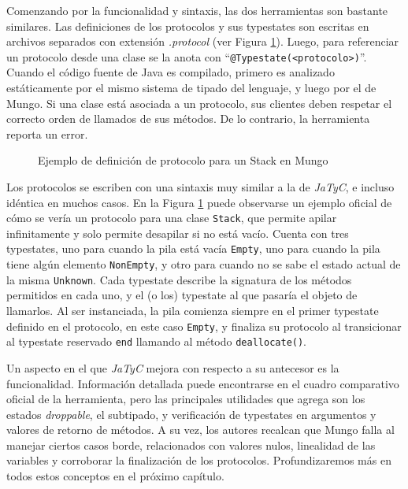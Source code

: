 Comenzando por la funcionalidad y sintaxis, las dos herramientas son bastante similares. Las definiciones de los protocolos y sus typestates son escritas en archivos separados con extensión \textit{.protocol} (ver Figura \ref{teorico:mungo}). Luego, para referenciar un protocolo desde una clase se la anota con ``\texttt{@Typestate(<protocolo>)}''. Cuando el código fuente de Java es compilado, primero es analizado estáticamente por el mismo sistema de tipado del lenguaje, y luego por el de Mungo. Si una clase está asociada a un protocolo, sus clientes deben respetar el correcto orden de llamados de sus métodos. De lo contrario, la herramienta reporta un error.

\begin{figure}[htbp]
    \centering
    
    \caption{Ejemplo de definición de protocolo para un Stack en Mungo}
    \label{teorico:mungo}
\end{figure}

Los protocolos se escriben con una sintaxis muy similar a la de \textit{JaTyC}, e incluso idéntica en muchos casos. En la Figura \ref{teorico:mungo} puede observarse un ejemplo oficial de cómo se vería un protocolo para una clase \texttt{Stack}, que permite apilar infinitamente y solo permite desapilar si no está vacío. Cuenta con tres typestates, uno para cuando la pila está vacía \texttt{Empty}, uno para cuando la pila tiene algún elemento \texttt{NonEmpty}, y otro para cuando no se sabe el estado actual de la misma \texttt{Unknown}. Cada typestate describe la signatura de los métodos permitidos en cada uno, y el (o los) typestate al que pasaría el objeto de llamarlos. Al ser instanciada, la pila comienza siempre en el primer typestate definido en el protocolo, en este caso \texttt{Empty}, y finaliza su protocolo al transicionar al typestate reservado \texttt{end} llamando al método \texttt{deallocate()}.

Un aspecto en el que \textit{JaTyC} mejora con respecto a su antecesor es la funcionalidad. Información detallada puede encontrarse en el cuadro comparativo oficial de la herramienta\cite{jatyc:mungo-comparison}, pero las principales utilidades que agrega son los estados \textit{droppable}, el subtipado, y verificación de typestates en argumentos y valores de retorno de métodos. A su vez, los autores recalcan que Mungo falla al manejar ciertos casos borde, relacionados con valores nulos, linealidad de las variables y corroborar la finalización de los protocolos. Profundizaremos más en todos estos conceptos en el próximo capítulo.

